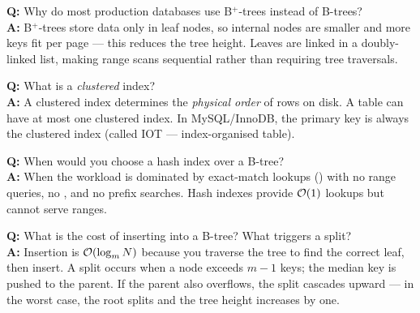 \begin{interviewbox}
\textbf{Q:} Why do most production databases use B$^+$-trees instead of B-trees?\\[4pt]
\textbf{A:} B$^+$-trees store data only in leaf nodes, so internal nodes are smaller and more keys fit per page --- this reduces the tree height.  Leaves are linked in a doubly-linked list, making range scans sequential rather than requiring tree traversals.

\vspace{6pt}
\textbf{Q:} What is a \emph{clustered} index?\\[4pt]
\textbf{A:} A clustered index determines the \emph{physical order} of rows on disk.  A table can have at most one clustered index.  In MySQL/InnoDB, the primary key is always the clustered index (called IOT --- index-organised table).

\vspace{6pt}
\textbf{Q:} When would you choose a hash index over a B-tree?\\[4pt]
\textbf{A:} When the workload is dominated by exact-match lookups () with no range queries, no , and no prefix  searches.  Hash indexes provide $\mathcal{O}(1)$ lookups but cannot serve ranges.

\vspace{6pt}
\textbf{Q:} What is the cost of inserting into a B-tree?  What triggers a split?\\[4pt]
\textbf{A:} Insertion is $\mathcal{O}(\log_m N)$ because you traverse the tree to find the correct leaf, then insert.  A split occurs when a node exceeds $m-1$ keys; the median key is pushed to the parent.  If the parent also overflows, the split cascades upward --- in the worst case, the root splits and the tree height increases by one.
\end{interviewbox}
